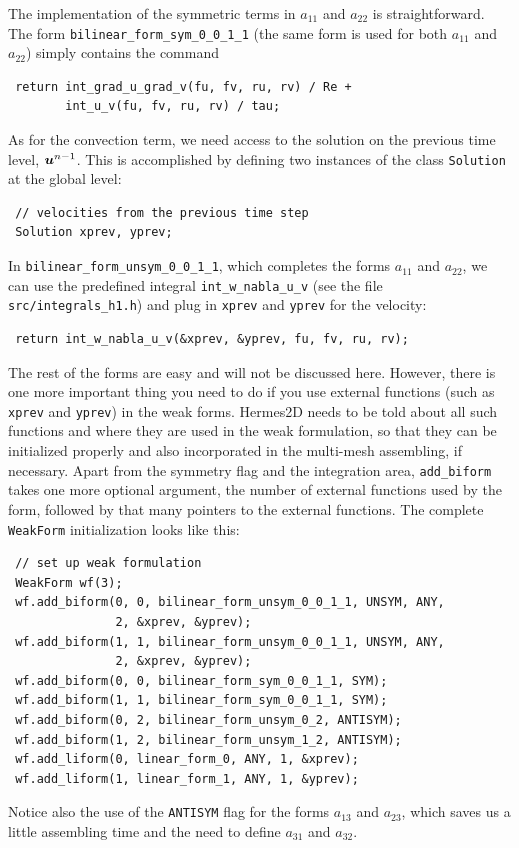 \documentclass[11pt]{article}
\newcommand{\bfu}{\mbox{\boldmath $u$}}
\begin{document}
The implementation of the symmetric terms in $a_{11}$ and $a_{22}$ is straightforward. The form
\verb"bilinear_form_sym_0_0_1_1" (the same form is used for both $a_{11}$ and $a_{22}$)
simply contains the command
\begin{lstlisting}
 return int_grad_u_grad_v(fu, fv, ru, rv) / Re +
        int_u_v(fu, fv, ru, rv) / tau;
\end{lstlisting}
As for the convection term, we need access to the solution on the previous time level, $\bfu^{n-1}$.
This is accomplished by defining two instances of the class {\tt Solution} at the global level:
\begin{lstlisting}
 // velocities from the previous time step
 Solution xprev, yprev;
\end{lstlisting}
In \verb"bilinear_form_unsym_0_0_1_1", which completes the forms $a_{11}$ and $a_{22}$, we can use
the predefined integral \verb"int_w_nabla_u_v" (see the
file {\tt src/integrals\_h1.h})
and plug in {\tt xprev} and {\tt yprev} for the velocity:
\begin{lstlisting}
 return int_w_nabla_u_v(&xprev, &yprev, fu, fv, ru, rv);
\end{lstlisting}
The rest of the forms are easy and will not be discussed here. However, there is one more important
thing you need to do if you use external functions (such as {\tt xprev} and {\tt yprev}) in the
weak forms. Hermes2D needs to be told about all such functions and where they are used in the weak
formulation, so that they can be initialized properly and also incorporated in the multi-mesh assembling,
if necessary.
Apart from the symmetry flag and the integration area,
{\tt add\_biform} takes one more optional argument, the number of external functions used by the form,
followed by that many pointers to the external functions. The complete {\tt WeakForm} initialization
looks like this:
\begin{lstlisting}
 // set up weak formulation
 WeakForm wf(3);
 wf.add_biform(0, 0, bilinear_form_unsym_0_0_1_1, UNSYM, ANY,
               2, &xprev, &yprev);
 wf.add_biform(1, 1, bilinear_form_unsym_0_0_1_1, UNSYM, ANY,
               2, &xprev, &yprev);
 wf.add_biform(0, 0, bilinear_form_sym_0_0_1_1, SYM);
 wf.add_biform(1, 1, bilinear_form_sym_0_0_1_1, SYM);
 wf.add_biform(0, 2, bilinear_form_unsym_0_2, ANTISYM);
 wf.add_biform(1, 2, bilinear_form_unsym_1_2, ANTISYM);
 wf.add_liform(0, linear_form_0, ANY, 1, &xprev);
 wf.add_liform(1, linear_form_1, ANY, 1, &yprev);
\end{lstlisting}
Notice also the use of the {\tt ANTISYM} flag for the forms $a_{13}$ and $a_{23}$, which
saves us a little assembling time and the need to define $a_{31}$ and $a_{32}$.
\end{document}
